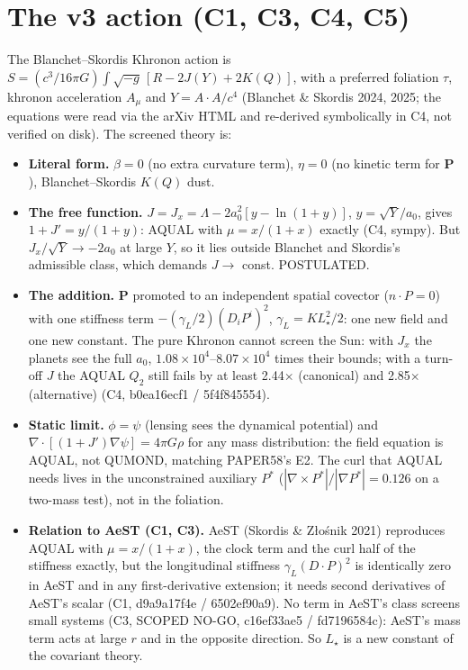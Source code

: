 \documentclass[10pt]{article}
\begin{document}
\section{The v3 action (C1, C3, C4, C5)}
The Blanchet--Skordis Khronon action is $S=(c^3/16\pi G)\int\sqrt{-g}\,[R-2J(Y)+2K(Q)]$, with a preferred foliation $\tau$, khronon acceleration $A_\mu$ and $Y=A\cdot A/c^4$ (Blanchet \& Skordis 2024, 2025; the equations were read via the arXiv HTML and re-derived symbolically in C4, not verified on disk). The screened theory is:
\begin{itemize}
\item \textbf{Literal form.} $\beta=0$ (no extra curvature term), $\eta=0$ (no kinetic term for $\mathbf P$), Blanchet--Skordis $K(Q)$ dust.
\item \textbf{The free function.} $J=J_x=\Lambda-2a_0^2[y-\ln(1+y)]$, $y=\sqrt Y/a_0$, gives $1+J'=y/(1+y)$: AQUAL with $\mu=x/(1+x)$ exactly (C4, sympy). But $J_x/\sqrt Y\to-2a_0$ at large $Y$, so it lies outside Blanchet and Skordis's admissible class, which demands $J\to$ const. POSTULATED.
\item \textbf{The addition.} $\mathbf P$ promoted to an independent spatial covector ($n\cdot P=0$) with one stiffness term $-(\gamma_L/2)(D_iP^i)^2$, $\gamma_L=KL_\star^2/2$: one new field and one new constant. The pure Khronon cannot screen the Sun: with $J_x$ the planets see the full $a_0$, $1.08\times10^{4}$--$8.07\times10^{4}$ times their bounds; with a turn-off $J$ the AQUAL $Q_2$ still fails by at least 2.44$\times$ (canonical) and 2.85$\times$ (alternative) (C4, b0ea16ecf1 / 5f4f845554).
\item \textbf{Static limit.} $\phi=\psi$ (lensing sees the dynamical potential) and $\nabla\cdot[(1+J')\nabla\psi]=4\pi G\rho$ for any mass distribution: the field equation is AQUAL, not QUMOND, matching PAPER58's E2. The curl that AQUAL needs lives in the unconstrained auxiliary $P^\ast$ ($|\nabla\times P^\ast|/|\nabla P^\ast|=0.126$ on a two-mass test), not in the foliation.
\item \textbf{Relation to AeST (C1, C3).} AeST (Skordis \& Z{\l}o{\'s}nik 2021) reproduces AQUAL with $\mu=x/(1+x)$, the clock term and the curl half of the stiffness exactly, but the longitudinal stiffness $\gamma_L(D\cdot P)^2$ is identically zero in AeST and in any first-derivative extension; it needs second derivatives of AeST's scalar (C1, d9a9a17f4e / 6502ef90a9). No term in AeST's class screens small systems (C3, SCOPED NO-GO, c16ef33ae5 / fd7196584c): AeST's mass term acts at large $r$ and in the opposite direction. So $L_\star$ is a new constant of the covariant theory.

\end{itemize}
\end{document}
